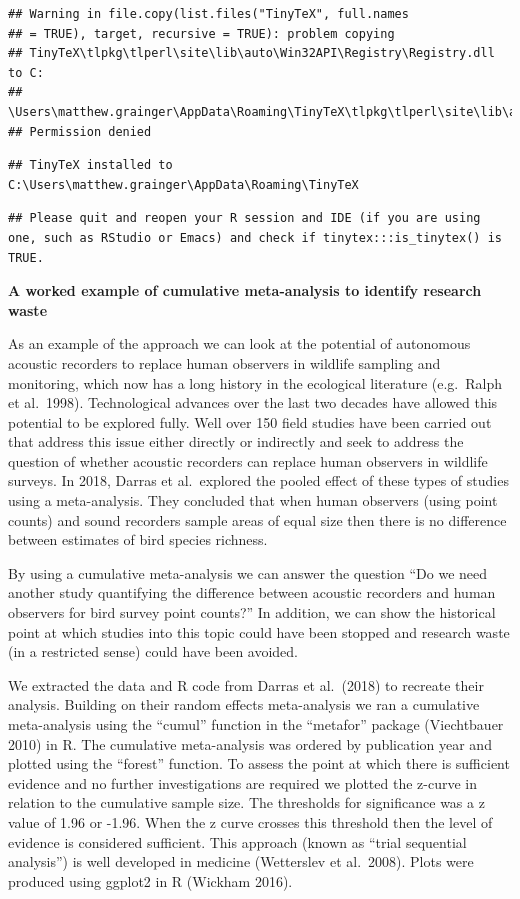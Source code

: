 \documentclass[]{article}
\begin{document}
\begin{verbatim}
## Warning in file.copy(list.files("TinyTeX", full.names
## = TRUE), target, recursive = TRUE): problem copying
## TinyTeX\tlpkg\tlperl\site\lib\auto\Win32API\Registry\Registry.dll to C:
## \Users\matthew.grainger\AppData\Roaming\TinyTeX\tlpkg\tlperl\site\lib\auto\Win32API\Registry\Registry.dll:
## Permission denied
\end{verbatim}

\begin{verbatim}
## TinyTeX installed to C:\Users\matthew.grainger\AppData\Roaming\TinyTeX
\end{verbatim}

\begin{verbatim}
## Please quit and reopen your R session and IDE (if you are using one, such as RStudio or Emacs) and check if tinytex:::is_tinytex() is TRUE.
\end{verbatim}

\textbf{A worked example of cumulative meta-analysis to identify
research waste}

As an example of the approach we can look at the potential of autonomous
acoustic recorders to replace human observers in wildlife sampling and
monitoring, which now has a long history in the ecological literature
(e.g.~Ralph et al.~1998). Technological advances over the last two
decades have allowed this potential to be explored fully. Well over 150
field studies have been carried out that address this issue either
directly or indirectly and seek to address the question of whether
acoustic recorders can replace human observers in wildlife surveys. In
2018, Darras et al.~explored the pooled effect of these types of studies
using a meta-analysis. They concluded that when human observers (using
point counts) and sound recorders sample areas of equal size then there
is no difference between estimates of bird species richness.

By using a cumulative meta-analysis we can answer the question ``Do we
need another study quantifying the difference between acoustic recorders
and human observers for bird survey point counts?'' In addition, we can
show the historical point at which studies into this topic could have
been stopped and research waste (in a restricted sense) could have been
avoided.

We extracted the data and R code from Darras et al.~(2018) to recreate
their analysis. Building on their random effects meta-analysis we ran a
cumulative meta-analysis using the ``cumul'' function in the ``metafor''
package (Viechtbauer 2010) in R. The cumulative meta-analysis was
ordered by publication year and plotted using the ``forest'' function.
To assess the point at which there is sufficient evidence and no further
investigations are required we plotted the z-curve in relation to the
cumulative sample size. The thresholds for significance was a z value of
1.96 or -1.96. When the z curve crosses this threshold then the level of
evidence is considered sufficient. This approach (known as ``trial
sequential analysis'') is well developed in medicine (Wetterslev et
al.~2008). Plots were produced using ggplot2 in R (Wickham 2016).
\end{document}
